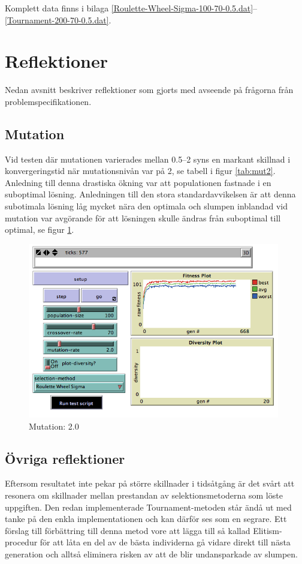 \documentclass[titlepage, a4paper, 12pt]{article}
\begin{document}
Komplett data finns i bilaga
\ref{Roulette-Wheel-Sigma-100-70-0.5.dat}–\ref{Tournament-200-70-0.5.dat}.

\section{Reflektioner}\label{sec:reflektioner}
Nedan avsnitt beskriver reflektioner som gjorts med avseende på
frågorna från problemspecifikationen.

\subsection{Mutation}
Vid testen där mutationen varierades mellan 0.5–2 syns en markant
skillnad i konvergeringstid när mutationsnivån var på 2, se tabell i
figur \ref{tab:mut2}. Anledning till denna drastiska ökning var att
populationen fastnade i en suboptimal lösning. Anledningen till den
stora standardavvikelsen är att denna subotimala lösning låg mycket
nära den optimala och slumpen inblandad vid mutation var avgörande för
att lösningen skulle ändras från suboptimal till optimal, se figur
\ref{fig:images/Roulette-Wheel-Sigma-100-70-2-20}.

\begin{figure}[H]
  \begin{center}
    \includegraphics[width=110mm]{images/Roulette-Wheel-Sigma-100-70-2-20.png}
    \caption{Mutation: 2.0}
    \label{fig:images/Roulette-Wheel-Sigma-100-70-2-20}
  \end{center}
\end{figure}

\subsection{Övriga reflektioner}
Eftersom resultatet inte pekar på större skillnader i tidsåtgång är
det svårt att resonera om skillnader mellan prestandan av
selektionsmetoderna som löste uppgiften. Den redan implementerade
Tournament-metoden står ändå ut med tanke på den enkla
implementationen och kan därför ses som en segrare. Ett förslag till
förbättring till denna metod vore att lägga till så kallad
Elitism-procedur \cite{gen-intro} för att låta en del av de bästa
individerna gå vidare direkt till nästa generation och alltså
eliminera risken av att de blir undansparkade av slumpen.
    
\end{document}
